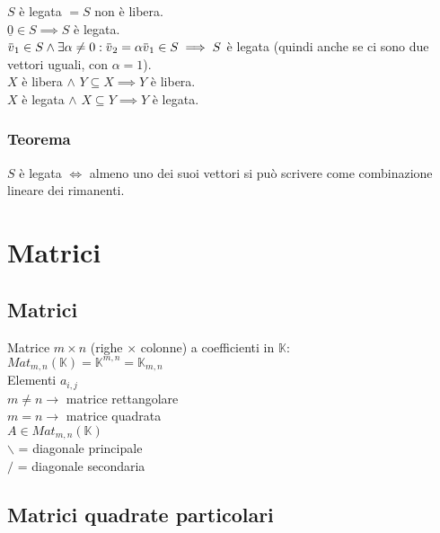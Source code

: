 \documentclass[a4paper, twoside, italian, 11pt]{book}
\newcommand{\overbar}[1] {\mkern 1.5mu\overline{\mkern-1.5mu#1\mkern-1.5mu}\mkern 1.5mu}
\newcommand{\K}{\mathbb K}
\begin{document}
\noindent
$S$ è legata $= S$ non è libera. \\
$\underline 0 \in S \implies S$ è legata. \\
$\overbar v_1 \in S \land \exists \alpha \neq 0 : \overbar v_2 = \alpha \overbar v_1 \in S \implies S$ è legata (quindi anche se ci sono due vettori uguali, con $\alpha = 1$). \\
$X$ è libera $\land$ $Y \subseteq X \implies Y$ è libera. \\
$X$ è legata $\land$ $X \subseteq Y \implies Y$ è legata.

\subsection{Teorema}

$S$ è legata $\iff$ almeno uno dei suoi vettori si può scrivere come combinazione lineare dei rimanenti.




\chapter{Matrici}



\section {Matrici}

Matrice $m \times n$ (righe $\times$ colonne) a coefficienti in $\K$: \\
$Mat_{m,n}(\K) = \K^{m,n} = \K_{m,n}$ \\

\noindent
Elementi $a_{i, j}$ \\

\noindent
$m \neq n \rightarrow$ matrice rettangolare \\
$m = n \rightarrow$ matrice quadrata \\

\noindent
$A \in Mat_{m,n}(\K)$ \\

\noindent
$\backslash$ = diagonale principale \\
$/$ = diagonale secondaria \\



\section{Matrici quadrate particolari}
\end{document}

